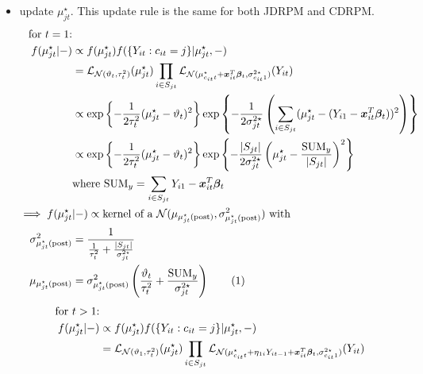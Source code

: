 \documentclass[12pt,	%
	a4paper,		%
	twoside,		%
	openright,		%
	titlepage,%
	]{book}
\theoremstyle{definition}
\begin{document}
\begin{itemize}
\item update $\mu^\star_{jt}$. This update rule is the same for both JDRPM and CDRPM.
\begin{align*}
\text{for $t=1$:}&\\
    f({\mu}_{jt}^\star|-)&\propto f({\mu}_{jt}^\star)f(\{Y_{it} : c_{it}=j\}|\mu^\star_{jt},-)\\
    &=\law_{\N(\theta_t,\tau^2_t)}(\mu^\star_{jt})\prod_{i\in S_{jt}}\law_{\N(\mu^\star_{c_{it}t}+ \vec{x}_{it}^T\vec{\beta}_t,\sigma^{2\star}_{c_{it}1})}(Y_{it})\\
    &\propto \expp{-\frac{1}{2\tau_t^2}(\mu^\star_{jt}-\theta_t)^2} \expp{-\frac{1}{2\sigma^{2\star}_{jt}}\left( \sum_{i \in S_{jt}} (\mu_{jt}^\star - (Y_{i1}-\vec{x}_{it}^T\vec{\beta}_t))^2 \right)}\\
    &\propto \expp{-\frac{1}{2\tau_t^2}(\mu^\star_{jt}-\theta_t)^2} \expp{-\frac{|S_{jt}|}{2\sigma^{2\star}_{jt}}\left( \mu^\star_{jt} - \frac{\text{SUM}_y}{|S_{jt}|} \right)^2}\\
    &\text{where SUM}_y = \sum_{i \in S_{jt}} Y_{i1}-\vec{x}_{it}^T\vec{\beta}_t\\
\implies f(\mu^\star_{jt}&|-) \propto \text{kernel of a $\N(\mu_{\postp{\mu^\star_{jt}}},\sigma^2_{\postp{\mu^\star_{jt}}})$ with}\\
\sigma^2_{\postp{\mu^\star_{jt}}}&=\frac{1}{\frac{1}{\tau^2_t}+\frac{|S_{jt}|}{\sigma^{2\star}_{jt}}}\\
%
\mu_{\postp{\mu^\star_{jt}}}&=\sigma^2_{\postp{\mu^\star_{jt}}}\left( \frac{\theta_t}{\tau_t^2} + \frac{\text{SUM}_y}{\sigma^{2\star}_{jt}} \right)
\tag{\stepcounter{equation}\theequation}
\end{align*}
\begin{align*}
\text{for $t>1$:}&\\
    f({\mu}_{jt}^\star|-)&\propto f({\mu}_{jt}^\star)f(\{Y_{it}: c_{it}=j\}|\mu^\star_{jt},-)\\
    &=\law_{\N(\theta_1,\tau^2_t)}(\mu^\star_{jt})\prod_{i\in S_{jt}}\law_{\N(\mu^\star_{c_{it}t} +\eta_{1i}Y_{it-1}+ \vec{x}_{it}^T\vec{\beta}_t,\sigma^{2\star}_{c_{it}1})}(Y_{it})\\

\end{align*}
\end{itemize}
\end{document}
